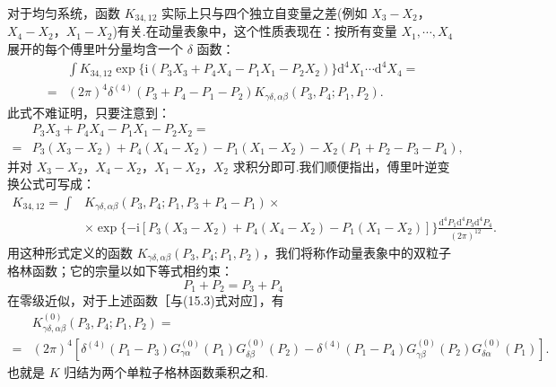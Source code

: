 对于均匀系统，函数 $K_{34,12}$ 实际上只与四个独立自变量之差(例如 $X_3-X_2$，$X_4-X_2$，$X_1-X_2$)有关.在动量表象中，这个性质表现在：按所有变量 $X_1,\cdots,X_4$ 展开的每个傅里叶分量均含一个 $\delta$ 函数：
\begin{equation}
\begin{aligned}
  &\int K_{34,12}\exp\{\mathrm{i}(P_3X_3+P_4X_4-P_1X_1-P_2X_2)\}\mathrm{d}^4X_1\cdots\mathrm{d}^4X_4=\\
  =&(2\pi)^4\delta^{(4)}(P_3+P_4-P_1-P_2)K_{\gamma\delta,\alpha\beta}(P_3,P_4;P_1,P_2).
\end{aligned}
\end{equation}
此式不难证明，只要注意到：
\begin{equation*}
\begin{aligned}
  &P_3X_3+P_4X_4-P_1X_1-P_2X_2=\\
  =&P_3(X_3-X_2)+P_4(X_4-X_2)-P_1(X_1-X_2)-X_2(P_1+P_2-P_3-P_4),
\end{aligned}
\end{equation*}
并对 $X_3-X_2$，$X_4-X_2$，$X_1-X_2$，$X_2$ 求积分即可.我们顺便指出，傅里叶逆变换公式可写成：
\begin{equation}
\begin{aligned}
  K_{34,12}=\int &K_{\gamma\delta,\alpha\beta}(P_3,P_4;P_1,P_3+P_4-P_1)\times\\
  &\times\exp\{-\mathrm{i}[P_3(X_3-X_2)+P_4(X_4-X_2)-P_1(X_1-X_2)]\}
  \frac{\mathrm{d}^4P_1\mathrm{d}^4P_3\mathrm{d}^4P_4}{(2\pi)^{12}}.
\end{aligned}
\end{equation}
用这种形式定义的函数 $K_{\gamma\delta,\alpha\beta}(P_3,P_4;P_1,P_2)$，我们将称作动量表象中的双粒子格林函数；它的宗量以如下等式相约束：
\begin{equation*}
  P_1+P_2=P_3+P_4
\end{equation*}
在零级近似，对于上述函数［与(15.3)式对应］，有
\begin{equation}
\begin{aligned}
  &K^{(0)}_{\gamma\delta,\alpha\beta}(P_3,P_4;P_1,P_2)=\\
  =&(2\pi)^4[\delta^{(4)}(P_1-P_3)G^{(0)}_{\gamma\alpha}(P_1)G^{(0)}_{\delta\beta}(P_2)
  -\delta^{(4)}(P_1-P_4)G^{(0)}_{\gamma\beta}(P_2)G^{(0)}_{\delta\alpha}(P_1)].
\end{aligned}
\end{equation}
也就是 $K$ 归结为两个单粒子格林函数乘积之和.

